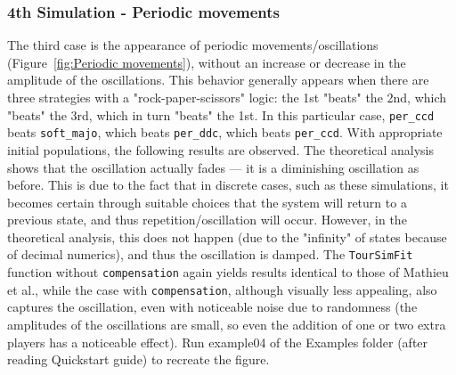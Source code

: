 \documentclass[12pt]{article}
\begin{document}
\subsubsection{4th Simulation - Periodic movements}
The third case is the appearance of periodic movements/oscillations (Figure~\ref{fig:Periodic movements}), without an increase or decrease in the amplitude of the oscillations. This behavior generally appears when there are three strategies with a "rock-paper-scissors" logic: the 1st "beats" the 2nd, which "beats" the 3rd, which in turn "beats" the 1st. In this particular case, \texttt{per\_ccd} beats \texttt{soft\_majo}, which beats \texttt{per\_ddc}, which beats \texttt{per\_ccd}. With appropriate initial populations, the following results are observed. The theoretical analysis shows that the oscillation actually fades — it is a diminishing oscillation as before. This is due to the fact that in discrete cases, such as these simulations, it becomes certain through suitable choices that the system will return to a previous state, and thus repetition/oscillation will occur. However, in the theoretical analysis, this does not happen (due to the "infinity" of states because of decimal numerics), and thus the oscillation is damped. The \texttt{TourSimFit} function without \texttt{compensation} again yields results identical to those of Mathieu et al., while the case with \texttt{compensation}, although visually less appealing, also captures the oscillation, even with noticeable noise due to randomness (the amplitudes of the oscillations are small, so even the addition of one or two extra players has a noticeable effect). Run example04 of the Examples folder (after reading Quickstart guide) to recreate the figure.
\end{document}
